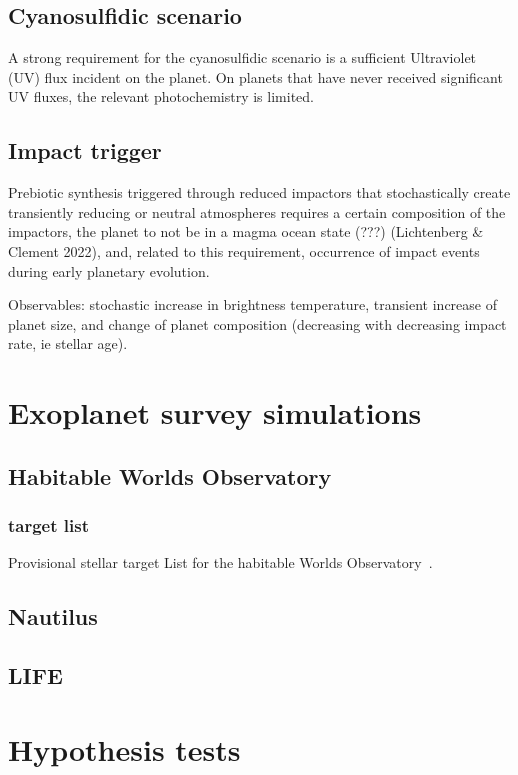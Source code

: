 \documentclass[twocolumn]{aastex631}
\begin{document}
\subsection{Cyanosulfidic scenario}
A strong requirement for the cyanosulfidic scenario is a sufficient Ultraviolet (UV) flux incident on the planet.
On planets that have never received significant UV fluxes, the relevant photochemistry is limited.

\subsection{Impact trigger}
Prebiotic synthesis triggered through reduced impactors that stochastically create transiently reducing or neutral atmospheres requires a certain composition of the impactors, the planet to not be in a magma ocean state (???) (Lichtenberg \& Clement 2022), and, related to this requirement, occurrence of impact events during early planetary evolution.

Observables: stochastic increase in brightness temperature, transient increase of planet size, and change of planet composition (decreasing with decreasing impact rate, ie stellar age).


\section{Exoplanet survey simulations}
\subsection{Habitable Worlds Observatory}
\subsubsection{target list}
Provisional stellar target List for the habitable Worlds Observatory~\citep{Mamajek2023}.

\subsection{Nautilus}
\subsection{LIFE} %

\section{Hypothesis tests}
\label{sec:hypotests}
\end{document}
